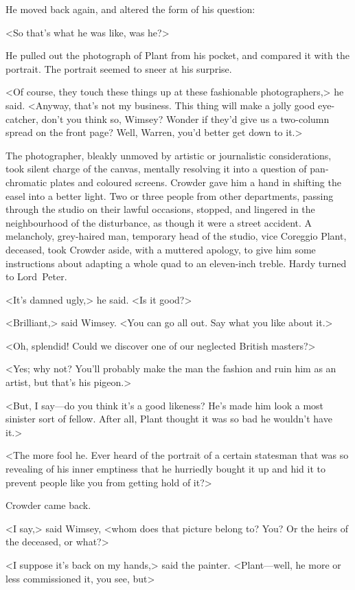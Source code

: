 He moved back again, and altered the form of his question:

<So that's what he was like, was he?>

He pulled out the photograph of Plant from his pocket, and compared it with the portrait. The portrait seemed to sneer at his surprise.

<Of course, they touch these things up at these fashionable photographers,> he said. <Anyway, that's not my business. This thing will make a jolly good eye-catcher, don't you think so, Wimsey? Wonder if they'd give us a two-column spread on the front page? Well, Warren, you'd better get down to it.>

The photographer, bleakly unmoved by artistic or journalistic considerations, took silent charge of the canvas, mentally resolving it into a question of pan-chromatic plates and coloured screens. Crowder gave him a hand in shifting the easel into a better light. Two or three people from other departments, passing through the studio on their lawful occasions, stopped, and lingered in the neighbourhood of the disturbance, as though it were a street accident. A melancholy, grey-haired man, temporary head of the studio, vice Coreggio Plant, deceased, took Crowder aside, with a muttered apology, to give him some instructions about adapting a whole quad to an eleven-inch treble. Hardy turned to Lord~Peter.

<It's damned ugly,> he said. <Is it good?>

<Brilliant,> said Wimsey. <You can go all out. Say what you like about it.>

<Oh, splendid! Could we discover one of our neglected British masters?>

<Yes; why not? You'll probably make the man the fashion and ruin him as an artist, but that's his pigeon.>

<But, I say—do you think it's a good likeness? He's made him look a most sinister sort of fellow. After all, Plant thought it was so bad he wouldn't have it.>

<The more fool he. Ever heard of the portrait of a certain statesman that was so revealing of his inner emptiness that he hurriedly bought it up and hid it to prevent people like you from getting hold of it?>

Crowder came back.

<I say,> said Wimsey, <whom does that picture belong to? You? Or the heirs of the deceased, or what?>

<I suppose it's back on my hands,> said the painter. <Plant—well, he more or less commissioned it, you see, but\longdash>

